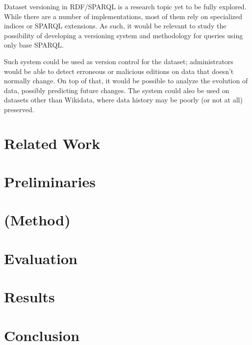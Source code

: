 \documentclass[11pt, titlepage]{article}
\begin{document}
Dataset versioning in RDF/SPARQL is a research topic yet to be fully explored. While there are a number of implementations, most of them rely on specialized indices or SPARQL extensions. As such, it would be relevant to study the possibility of developing a versioning system and methodology for queries using only base SPARQL.


Such system could be used as version control for the dataset; administrators would be able to detect erroneous or malicious editions on data that doesn't normally change. On top of that, it would be possible to analyze the evolution of data, possibly predicting future changes. The system could also be used on datasets other than Wikidata, where data history may be poorly (or not at all) preserved.

\section{Related Work}

\section{Preliminaries} %
\section{(Method)} %
\section{Evaluation} %
\section{Results}    %
\section{Conclusion}
\newpage


\end{document}

